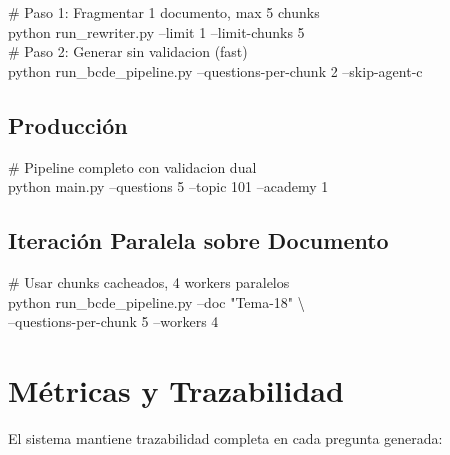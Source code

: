 \documentclass[10pt,twocolumn,letterpaper]{article}
\begin{document}
\begin{tcolorbox}[colback=bglight, colframe=bordercolor, boxrule=0.5pt, arc=2pt]
{\small\ttfamily
\# Paso 1: Fragmentar 1 documento, max 5 chunks\\
python run\_rewriter.py --limit 1 --limit-chunks 5\\[4pt]
\# Paso 2: Generar sin validacion (fast)\\
python run\_bcde\_pipeline.py --questions-per-chunk 2 --skip-agent-c
}
\end{tcolorbox}

\subsection{Producci\'on}

\begin{tcolorbox}[colback=bglight, colframe=bordercolor, boxrule=0.5pt, arc=2pt]
{\small\ttfamily
\# Pipeline completo con validacion dual\\
python main.py --questions 5 --topic 101 --academy 1
}
\end{tcolorbox}

\subsection{Iteraci\'on Paralela sobre Documento}

\begin{tcolorbox}[colback=bglight, colframe=bordercolor, boxrule=0.5pt, arc=2pt]
{\small\ttfamily
\# Usar chunks cacheados, 4 workers paralelos\\
python run\_bcde\_pipeline.py --doc "Tema-18" \textbackslash\\
\hspace*{1em}--questions-per-chunk 5 --workers 4
}
\end{tcolorbox}

\section{M\'etricas y Trazabilidad}

El sistema mantiene trazabilidad completa en cada pregunta generada:
\end{document}

